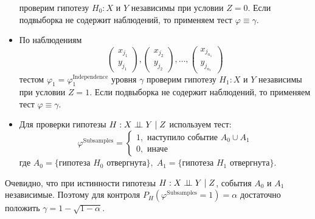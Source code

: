 \begin{itemize}
проверим гипотезу $H_0 : X$ и $Y$ независимы при условии $Z=0$.
Если подвыборка не содержит наблюдений, то применяем тест 
$\varphi \equiv \gamma$.
\item По наблюдениям 
    $$
    \begin{pmatrix}
        x_{j_1} \\
        y_{j_1} 
    \end{pmatrix},
    \begin{pmatrix}
        x_{j_2} \\
        y_{j_2}
    \end{pmatrix}, \ldots,
    \begin{pmatrix}
        x_{j_{n_1}} \\
        y_{j_{n_1}}
    \end{pmatrix}
    $$
тестом $\varphi_1=\varphi^{\text{Independence}}_1$ уровня $\gamma$
проверим гипотезу $H_1 : X$ и $Y$ независимы при условии $Z=1$.
Если подвыборка не содержит наблюдений, то применяем тест 
$\varphi \equiv \gamma$.
\item 
Для проверки гипотезы $H: X \perp\!\!\!\perp Y \mid Z$ используем тест:
$$
\varphi^{\text{Subsamples}}=\begin{cases}
    1, \text{ наступило событие $A_0 \cup A_1$}\\
    0, \text{ иначе}
\end{cases}
$$
где $A_0 = \{\text{гипотеза $H_0$ отвергнута}\},\;
A_1 = \{\text{гипотеза $H_1$ отвергнута}\}$.
\end{itemize}
Очевидно, что при истинности гипотезы $H: X \perp\!\!\!\perp Y \mid Z$,
события $A_0$ и $A_1$ независимые. Поэтому для контроля
$P_{H}(\varphi^{\text{Subsamples}}=1)=\alpha$ достаточно положить
$\gamma = 1 - \sqrt{1-\alpha}$.



